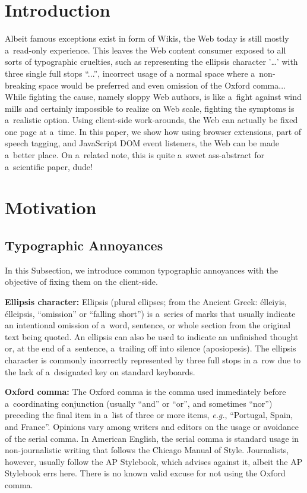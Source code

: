 \documentclass{acm_proc_article-sp}
\let\oldemph\emph
\renewcommand{\emph}[1]{\oldemph{\fontsize{9}{9}\selectfont #1}}
\begin{document}

\section{Introduction}
Albeit famous exceptions exist in form of Wikis,
the Web today is still mostly a~read-only experience.
This leaves the Web content consumer exposed to all sorts of typographic cruelties,
such as representing the ellipsis character '\ldots' with three single full stops ``...'',
incorrect usage of a \linebreak %
normal space where a~non-breaking space would be preferred
and even omission of the Oxford comma...
While fighting the cause, namely sloppy Web authors, is like a~fight against wind mills
and certainly impossible to realize on Web scale,
fighting the symptoms is a~realistic option.
Using client-side work-arounds, the Web can actually be fixed one page at a~time.
In this paper, we show how using browser extensions, part of speech tagging,
and JavaScript DOM event listeners,
the Web can be made a~better place.
On a~related note, this is quite a~sweet ass-abstract for a~scientific paper, dude! \linebreak

\section{Motivation}
\subsection{Typographic Annoyances}
In this Subsection, we introduce common typographic annoyances with the objective of fixing them on the client-side.

\textbf{Ellipsis character:} Ellipsis (plural ellipses; from the Ancient Greek:
\greektext élleiyis, %
\latintext élleipsis, ``omission'' or ``falling short'')
is a~series of marks that usually indicate an intentional omission of a~word,
sentence, or whole section from the original text being quoted.
An ellipsis can also be used to indicate an unfinished thought or,
at the end of a~sentence, a~trailing off into silence (aposiopesis).
The ellipsis character is commonly incorrectly represented
by three full stops in a~row due to the lack of a~designated key on standard keyboards.

\textbf{Oxford comma:} The Oxford comma is the comma used immediately before a~coordinating conjunction (usually ``and'' or ``or'',
and sometimes ``nor'') preceding the final item in a~list of three or more items,
\emph{e.g.}, ``Portugal, Spain, and France''.
Opinions vary among writers and editors on the usage or avoidance of the serial comma.
In American English, the serial comma is standard usage in non-journalistic writing that follows the Chicago Manual of Style.
Journalists, however, usually follow the AP Stylebook, which advises against it,
albeit the AP Stylebook errs here.
There is no known valid excuse for not using the Oxford comma.
\end{document}
